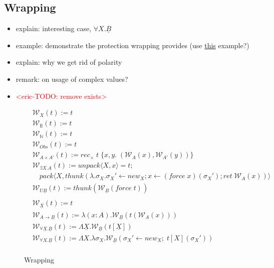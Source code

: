 \documentclass[acmsmall]{acmart}
\newcommand{\eric}[1]{\textcolor{red}{ <eric-#1> }}
\begin{document}
\subsection{Wrapping}\label{sec:Wrap}
\begin{itemize}
  \item explain: interesting case, $\forall X.\underline{B}$
  \item example: demonstrate the protection wrapping provides (use \href{https://publish.obsidian.md/2025/PhD/Shared/Parametricity+Logic/Case+Studies/Deep+Eta}{this} example?) 
  \item explain: why we get rid of polarity
  \item remark: on usage of complex values?
  \item \eric{TODO: remove exists}
\end{itemize}

\begin{figure}[H]
  \centering
  \footnotesize
  \begin{align*}
  &\mathcal{W} _X(t) := t\\
  &\mathcal{W} _\mathbb{B}(t) := t\\
  &\mathcal{W} _\mathbb{N}(t) := t\\
  &\mathcal{W} _{Obs}(t) := t\\
  &\mathcal{W} _{A \times A'}(t) := rec_\times \;t\;\{x,y.\; (\mathcal{W} _A(x),\mathcal{W} _{A'}(y))\}\\
  &\mathcal{W}_{\exists X.A}(t) :=  
  unpack\langle X,x \rangle = t; \\
  &\quad pack\langle X, thunk(\lambda.\sigma_X. \sigma_X' \leftarrow new_X;
  x \leftarrow (force\;x)(\sigma_X') ;ret\;\mathcal{W}_A(x))\rangle \\
  &\mathcal{W}_{U\underline{B}}(t) := thunk(\mathcal{W} _{\underline{B}}(force\;t))\\
  \\
  &\mathcal{W}_{\underline{X}}(t) := t\\
  &\mathcal{W} _{A \rightarrow \underline{B}}(t) := \lambda(x:A).\mathcal{W}_{\underline{B}}(t(\mathcal{W}_A(x)))\\
  &\mathcal{W}_{\forall \underline{X}.\underline{B}}(t) := 
  \Lambda \underline{X}.\mathcal{W}_{\underline{B}}(t[\underline{X}])\\
  &\mathcal{W}_{\forall X.\underline{B}}(t) := 
  \Lambda X.\lambda \sigma_X.  \mathcal{W}_{\underline{B}}(\sigma_X'\leftarrow new_X;\;t[X](\sigma_X'))\\
\end{align*}

\caption{Wrapping}
\end{figure}
\end{document}
